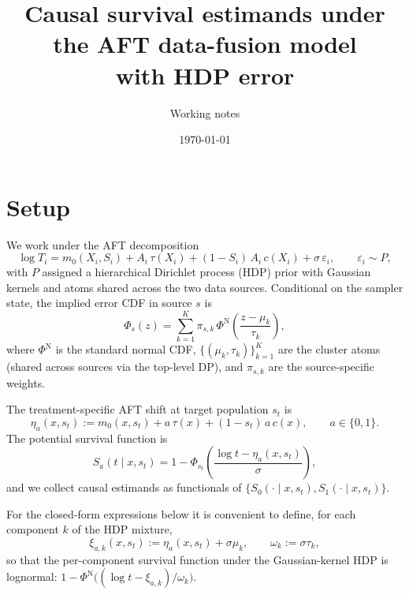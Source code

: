 \documentclass[11pt]{article}
\title{Causal survival estimands under the AFT data-fusion model\\
with HDP error}
\author{Working notes}
\date{\today}
\newcommand{\X}{X}
\newcommand{\A}{A}
\newcommand{\Sx}{S}
\newcommand{\tauf}{\tau}
\newcommand{\cf}{c}
\newcommand{\mzero}{m_{0}}
\newcommand{\Spot}{S}
\begin{document}
\maketitle

\section{Setup}

We work under the AFT decomposition
\begin{equation}
  \log T_{i} = \mzero(\X_{i}, \Sx_{i})
            + \A_{i}\,\tauf(\X_{i})
            + (1 - \Sx_{i})\,\A_{i}\,\cf(\X_{i})
            + \sigma\,\varepsilon_{i},
  \qquad \varepsilon_{i} \sim P,
  \label{eq:model}
\end{equation}
with $P$ assigned a hierarchical Dirichlet process (HDP) prior with Gaussian
kernels and atoms shared across the two data sources. Conditional on the
sampler state, the implied error CDF in source $s$ is
\begin{equation}
  \Phi_{s}(z) = \sum_{k=1}^{K} \pi_{s, k}\,
                \Phi^{\mathrm{N}}\!\left(\frac{z - \mu_{k}}{\tau_{k}}\right),
  \label{eq:hdp-cdf}
\end{equation}
where $\Phi^{\mathrm{N}}$ is the standard normal CDF,
$\{(\mu_{k}, \tau_{k})\}_{k=1}^{K}$ are the cluster atoms (shared across
sources via the top-level DP), and $\pi_{s,k}$ are the source-specific
weights.

The treatment-specific AFT shift at target population $s_{t}$ is
\begin{equation}
  \eta_{a}(x, s_{t}) := \mzero(x, s_{t})
                    + a\,\tauf(x)
                    + (1 - s_{t})\,a\,\cf(x),
  \qquad a \in \{0, 1\}.
\end{equation}
The potential survival function is
\begin{equation}
  \Spot_{a}(t \mid x, s_{t})
  = 1 - \Phi_{s_{t}}\!\left(\frac{\log t - \eta_{a}(x, s_{t})}{\sigma}\right),
  \label{eq:potential-S}
\end{equation}
and we collect causal estimands as functionals of
$\{\Spot_{0}(\cdot \mid x, s_{t}), \Spot_{1}(\cdot \mid x, s_{t})\}$.

For the closed-form expressions below it is convenient to define, for each
component $k$ of the HDP mixture,
\begin{equation}
  \xi_{a, k}(x, s_{t}) := \eta_{a}(x, s_{t}) + \sigma\mu_{k},
  \qquad
  \omega_{k} := \sigma\tau_{k},
\end{equation}
so that the per-component survival function under the Gaussian-kernel HDP
is lognormal:
$1 - \Phi^{\mathrm{N}}\bigl((\log t - \xi_{a, k})/\omega_{k}\bigr)$.
\end{document}
